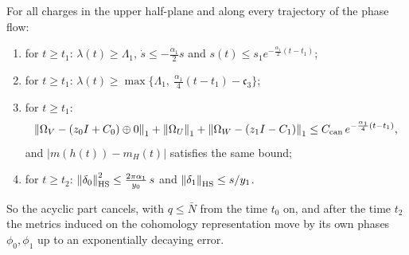 \begin{theorem}[Cancellation]\label{thm:cancellation}
For all charges in the upper half-plane and along every trajectory of the
phase flow:
\begin{enumerate}
\item[(i)] for $t\geq t_1$: $\lambda(t)\geq\Lambda_1$,
 $\dot s\leq-\frac{\alpha_1}2s$ and
 $s(t)\leq s_1e^{-\frac{\alpha_1}2(t-t_1)}$;
\item[(ii)] for $t\geq t_1$:
 $\lambda(t)\geq\max\{\Lambda_1,\ \frac{\alpha_1}4(t-t_1)-\mathfrak c_3\}$;
\item[(iii)] for $t\geq t_1$:
 \[
 \left\lVert\Omega_V-(z_0I+C_0)\oplus0\right\rVert_1+\left\lVert\Omega_U\right\rVert_1+\left\lVert\Omega_W-(z_1I-C_1)\right\rVert_1
 \leq C_{\mathrm{can}}\,e^{-\frac{\alpha_1}4(t-t_1)},
 \]
 and $|m(h(t))-m_H(t)|$ satisfies the same bound;
\item[(iv)] for $t\geq t_2$:
 $\left\lVert\delta_0\right\rVert_{\mathrm{HS}}^2\leq\frac{2\pi\alpha_1}{y_0}\,s$ and
 $\left\lVert\delta_1\right\rVert_{\mathrm{HS}}\leq s/y_1$.
\end{enumerate}
So the acyclic part cancels, with $q\leq\bar N$ from the time $t_0$ on, and
after the time $t_2$ the metrics induced on the cohomology representation move by its own
phases $\phi_0,\phi_1$ up to an exponentially decaying error.
\end{theorem}

